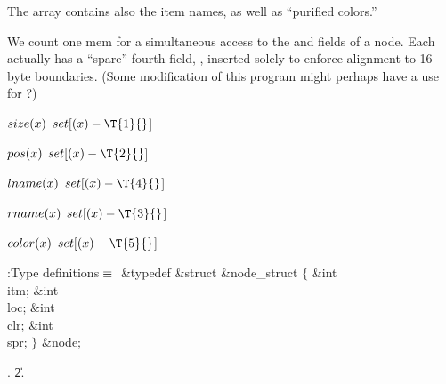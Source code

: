 The  array contains also the item names, as well as ``purified
colors.''

We count one mem for a simultaneous access to the  and 
fields
of a node. Each actually has a ``spare'' fourth field, , inserted
solely to enforce alignment to 16-byte boundaries.
(Some modification of this program might perhaps have a use for ?)

\Y\B\4\D$\\{size}(\|x)$ \5
$\\{set}[(\|x)-\T{1}{}$]\par
\B\4\D$\\{pos}(\|x)$ \5
$\\{set}[(\|x)-\T{2}{}$]\par
\B\4\D$\\{lname}(\|x)$ \5
$\\{set}[(\|x)-\T{4}{}$]\par
\B\4\D$\\{rname}(\|x)$ \5
$\\{set}[(\|x)-\T{3}{}$]\par
\B\4\D$\\{color}(\|x)$ \5
$\\{set}[(\|x)-\T{5}{}$]\par
\Y\B\4:Type definitions\X${}\equiv{}$\6
\&{typedef} \&{struct} \&{node\_struct} ${}\{{}$\1\6
\&{int} \\{itm};\6
\&{int} \\{loc};\6
\&{int} \\{clr};\6
\&{int} \\{spr};%
\2\6
${}\}{}$ \&{node};\par
{}.
\U2.\fi

